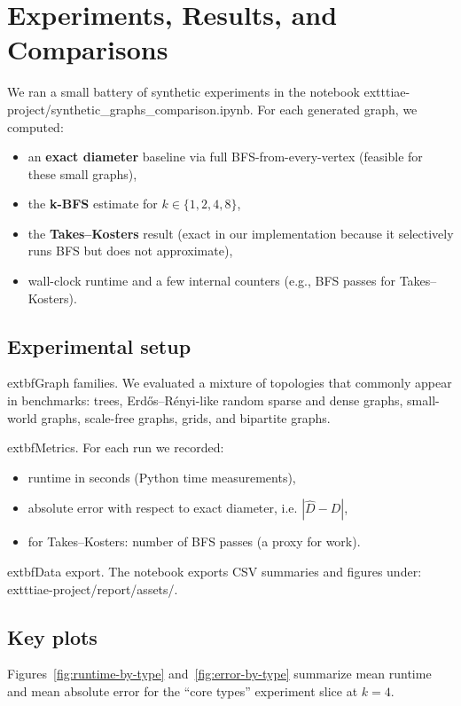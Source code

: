 \documentclass[11pt]{article}
\begin{document}
\section{Experiments, Results, and Comparisons}

We ran a small battery of synthetic experiments in the notebook
	exttt{iae-project/synthetic\_graphs\_comparison.ipynb}. For each generated graph, we computed:
\begin{itemize}
  \item an \textbf{exact diameter} baseline via full BFS-from-every-vertex (feasible for these small graphs),
  \item the \textbf{k-BFS} estimate for $k\in\{1,2,4,8\}$,
  \item the \textbf{Takes--Kosters} result (exact in our implementation because it selectively runs BFS but does not approximate),
  \item wall-clock runtime and a few internal counters (e.g., BFS passes for Takes--Kosters).
\end{itemize}

\subsection{Experimental setup}

	extbf{Graph families.} We evaluated a mixture of topologies that commonly appear in benchmarks:
trees, Erd\H{o}s--R\'enyi-like random sparse and dense graphs, small-world graphs, scale-free graphs,
grids, and bipartite graphs.

	extbf{Metrics.}
For each run we recorded:
\begin{itemize}
  \item runtime in seconds (Python time measurements),
  \item absolute error with respect to exact diameter, i.e.
  $|\widehat{D} - D|$,
  \item for Takes--Kosters: number of BFS passes (a proxy for work).
\end{itemize}

	extbf{Data export.}
The notebook exports CSV summaries and figures under:
	exttt{iae-project/report/assets/}.

\subsection{Key plots}

Figures~\ref{fig:runtime-by-type} and~\ref{fig:error-by-type} summarize mean runtime and mean absolute error
for the ``core types'' experiment slice at $k=4$.
\end{document}
